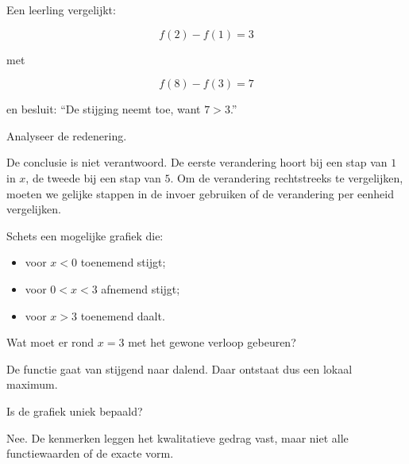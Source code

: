 \documentclass{ximera}
\begin{document}
\begin{oefening}{\oefU\ESS}

Een leerling vergelijkt:

\[
f(2)-f(1)=3
\]

met

\[
f(8)-f(3)=7
\]

en besluit: ``De stijging neemt toe, want \(7>3\).''

Analyseer de redenering.

\begin{oplossing}
De conclusie is niet verantwoord.
De eerste verandering hoort bij een stap van \(1\) in \(x\),
de tweede bij een stap van \(5\).
Om de verandering rechtstreeks te vergelijken, moeten we gelijke
stappen in de invoer gebruiken of de verandering per eenheid vergelijken.
\end{oplossing}

\end{oefening}


\begin{oefening}{\oefU\ESS}

Schets een mogelijke grafiek die:
\begin{itemize}
  \item voor \(x<0\) toenemend stijgt;
  \item voor \(0<x<3\) afnemend stijgt;
  \item voor \(x>3\) toenemend daalt.
\end{itemize}

\begin{question}
Wat moet er rond \(x=3\) met het gewone verloop gebeuren?
\begin{oplossing}
De functie gaat van stijgend naar dalend.
Daar ontstaat dus een lokaal maximum.
\end{oplossing}
\end{question}

\begin{question}
Is de grafiek uniek bepaald?
\begin{oplossing}
Nee. De kenmerken leggen het kwalitatieve gedrag vast,
maar niet alle functiewaarden of de exacte vorm.
\end{oplossing}
\end{question}

\end{oefening}
\end{document}
